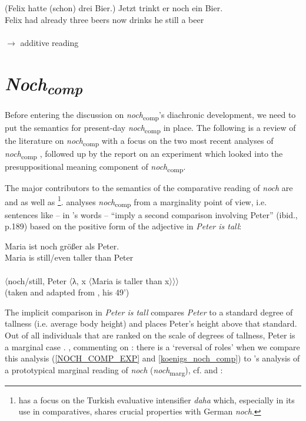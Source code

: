 \documentclass[output=paper
,modfonts
,nonflat]{langsci/langscibook}
\begin{document}
\ea\gll (Felix hatte (schon) drei Bier.) Jetzt trinkt er noch ein Bier.\\
       Felix had already three beers now drinks he still a beer\\
 \\ \hfill $\rightarrow$ additive reading \label{NOCH_ADD_EXP}
\z

\section{\textit{Noch\textsubscript{comp}}}\label{sec_noch-comp_gen}

Before entering the discussion on \textit{noch}\textsubscript{comp}'s diachronic development, we need to put the semantics for present-day \textit{noch}\textsubscript{comp} in place. The following is a review of the literature on \textit{noch}\textsubscript{comp} with a focus on the two most recent analyses of \textit{noch}\textsubscript{comp} \citep{umbach2009a_comp,Hofstetter2013}, followed up by the report on an experiment which looked into the presuppositional meaning component of \textit{noch}\textsubscript{comp}.

The major contributors to the semantics of the comparative reading of \textit{noch} are \citet{koenig1977} and \citet{umbach2009a_comp} as well as \citet{Hofstetter2013}\footnote{ \citet{Hofstetter2013} has a focus on the Turkish evaluative intensifier \textit{daha} which, especially in its use in comparatives, shares crucial properties with German \textit{noch}.}. \citet{koenig1977} analyses \textit{noch}\textsubscript{comp} from a marginality point of view, i.e. sentences like  -- in \citeauthor{koenig1977}'s words -- ``imply a second comparison involving Peter'' (ibid., p.189) based on the positive form of the adjective in \textit{Peter is tall}:

\ea\gll Maria ist noch größer als Peter.\\
       Maria is still/even taller than Peter\\
 \label{NOCH_COMP_EXP}\\
\z
\ea 〈{noch}/{still}, Peter 〈λ, x 〈Maria is taller than x〉〉〉 \label{koenigs_noch_comp} \\ (taken and adapted from \citeyearpar{koenig1977}, his 49') \z

The implicit comparison in \textit{Peter is tall} compares \textit{Peter} to a standard degree of tallness (i.e. average body height) and places Peter's height above that standard. Out of all individuals that are ranked on the scale of degrees of tallness, Peter is a marginal case \citep{koenig1977}. \citet{umbach2009a_comp}, commenting on \citealt{koenig1977}: there is a `reversal of roles' when we compare this analysis (\ref{NOCH_COMP_EXP} and \ref{koenigs_noch_comp}) to \citeauthor{koenig1977}'s analysis of a prototypical marginal reading of \textit{noch} (\textit{noch}\textsubscript{marg}), cf.  and :
\end{document}
